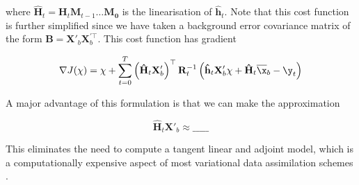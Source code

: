 where $\mathbf{\hat{H}}_t = \mathbf{H}_t\mathbf{M}_{t-1}\dots\mathbf{M_0}$ is the linearisation of $\mathbf{\hat{h}}_t$. Note that this cost function is further simplified since we have taken a background error covariance matrix of the form $\mathbf{B} = \mathbf{X}'_b\mathbf{X}_b^{\prime\top}$. This cost function has gradient

\[
\nabla J(\mathbf{\chi}) = \mathbf{\chi} + \sum_{t=0}^T\left(\mathbf{\hat{H}}_t \mathbf{X}'_b\right)^\top \mathbf{R}_t^{-1} \left(\mathbf{\hat{h}}_t \mathbf{X}'_b \chi + \mathbf{\hat{H}}_t \overline{\x}_b - \y_t\right)
\]

A major advantage of this formulation is that we can make the approximation

\[
\mathbf{\hat{H}}_t \mathbf{X}'_b \approx \_\_\_\_\_
\]

This eliminates the need to compute a tangent linear and adjoint model, which is a computationally expensive aspect of most variational data assimilation schemes \cite{Bannister2017}.